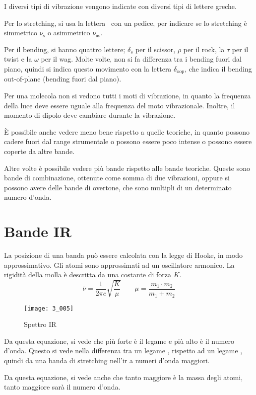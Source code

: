 I diversi tipi di vibrazione vengono indicate con diversi tipi di
lettere greche.

Per lo stretching, si usa la lettera \nu\ con un pedice, per indicare se
lo stretching è simmetrico \(\nu_{\text{s}}\) o asimmetrico \(\nu_{\text{as}}\).

Per il bending, si hanno quattro lettere; \(\delta_s\) per il scissor,
\(\rho\) per il rock, la \(\tau\) per il twist e la \(\omega\) per il
wag. Molte volte, non si fa differenza tra i bending fuori dal piano,
quindi si indica questo movimento con la lettera
\(\delta_{\text{oop}}\), che indica il bending out-of-plane (bending fuori dal piano).

Per una molecola non si vedono tutti i moti di vibrazione, in quanto  la frequenza della luce deve essere uguale alla frequenza
del moto vibrazionale.
Inoltre, il momento di dipolo deve cambiare durante la vibrazione.

È possibile anche vedere meno bene rispetto a quelle teoriche, in quanto
possono cadere fuori dal range strumentale o possono essere poco intense
o possono essere coperte da altre bande.

Altre volte è possibile vedere più bande rispetto alle bande teoriche.
Queste sono bande di combinazione, ottenute come somma di due
vibrazioni, oppure si possono avere delle bande di overtone, che sono
multipli di un determinato numero d'onda.

\section{Bande IR}

La posizione di una banda può essere calcolata con la legge di Hooke, in
modo approssimativo. Gli atomi sono approssimati ad un oscillatore
armonico. La rigidità della molla è descritta da una costante di forza
\(K\).
\[
\bar{\nu} = \frac{1}{2 \pi c} \sqrt{\frac{K}{\mu}} \qquad \mu = \frac{m_1 \cdot m_2}{m_1 + m_2}
\]

\begin{figure}[H]
    \texttt{[image: 3\_005]}
    \caption{Spettro IR}
\end{figure}

Da questa equazione, si vede che più forte è il legame e più alto è il
numero d'onda. Questo si vede nella differenza tra un legame ,
rispetto ad un legame , quindi da una banda di stretching nell'ir a
numeri d'onda maggiori.

Da questa equazione, si vede anche che tanto maggiore è la massa degli
atomi, tanto maggiore sarà il numero d'onda.

